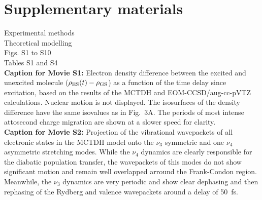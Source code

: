 \documentclass[12pt]{article}
\begin{document}
\section*{Supplementary materials}
Experimental methods\\
Theoretical modelling\\
Figs. S1 to S10\\
Tables S1 and S4\\
\textbf{Caption for Movie S1:} Electron density difference between the excited and unexcited molecule ($\rho_{\rm ES}(t)-\rho_{\rm GS}$) as a function of the time delay since excitation, based on the results of the MCTDH and EOM-CCSD/aug-cc-pVTZ calculations. Nuclear motion is not displayed. The isosurfaces of the density difference have the same isovalues as in Fig.~3A. The periods of most intense attosecond charge migration are shown at a slower speed for clarity.\\
%
\textbf{Caption for Movie S2:} Projection of the vibrational wavepackets of all electronic states in the MCTDH model onto the $\nu_3$ symmetric and one $\nu_4$ asymmetric stretching modes. While the $\nu_4$ dynamics are clearly responsible for the diabatic population transfer, the wavepackets of this modes do not show significant motion and remain well overlapped arround the Frank-Condon region. Meanwhile, the $\nu_3$ dynamics are very periodic and show clear dephasing and then rephasing of the Rydberg and valence wavepackets around a delay of 50~fs. 



%


\end{document}

